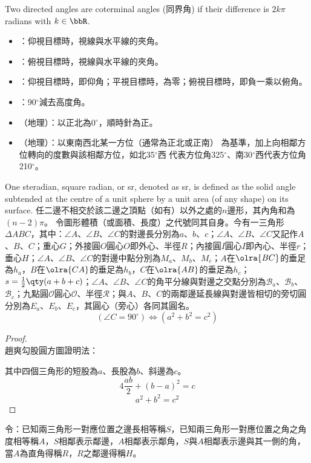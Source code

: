 \documentclass[a4paper,12pt]{report}
\begin{document}
Two directed angles are coterminal angles (同界角) if their difference is $2k\pi$ radians with $k\in\bbR$.
\begin{itemize}
\item {}：仰視目標時，視線與水平線的夾角。
\item {}：俯視目標時，視線與水平線的夾角。
\item {}：仰視目標時，即仰角；平視目標時，為零；俯視目標時，即負一乘以俯角。
\item {}：90$^{\circ}$減去高度角。
\item {}（地理）：以正北為0$^\circ$，順時針為正。
\item {}（地理）：以東南西北某一方位（通常為正北或正南） 為基準，加上向相鄰方位轉向的度數與該相鄰方位，如北35$^\circ$西 代表方位角325$^\circ$、南30$^\circ$西代表方位角210$^\circ$。
\end{itemize}
One steradian, square radian, or sr, denoted as sr, is defined as the solid angle subtended at the centre of a unit sphere by a unit area (of any shape) on its surface.
任二邊不相交於該二邊之頂點（如有）以外之處的$n$邊形，其內角和為$(n-2)\pi$。
令圖形體積（或面積、長度）之代號同其自身。今有一三角形$\Delta ABC$，其中：$\angle A$、$\angle B$、$\angle C$的對邊長分別為$a$、$b$、$c$；$\angle A$、$\angle B$、$\angle C$又記作$A$、$B$、$C$；重心$G$；外接圓$O$圓心$O$即外心、半徑$R$；內接圓$I$圓心$I$即內心、半徑$r$；垂心$H$；$\angle A$、$\angle B$、$\angle C$的對邊中點分別為$M_a$、$M_b$、$M_c$；$A$在$\olra{BC}$的垂足為$h_a$，$B$在$\olra{CA}$的垂足為$h_b$，$C$在$\olra{AB}$的垂足為$h_c$；$s=\frac{1}{2}\qty(a+b+c)$；$\angle A$、$\angle B$、$\angle C$的角平分線與對邊之交點分別為$\mathscr{B}_a$、$\mathscr{B}_b$、$\mathscr{B}_c$；九點圓$\mathscr{O}$圓心$\mathscr{O}$、半徑$\mathscr{R}$；與$A$、$B$、$C$的兩鄰邊延長線與對邊皆相切的旁切圓分別為$E_a$、$E_b$、$E_c$，其圓心（旁心）各同其圓名。
\[(\angle C=90^\circ)\iff (a^2+b^2=c^2)\]
\begin{proof}\mbox{}\\
趙爽勾股圓方圖證明法：
\begin{center}
\end{center}
其中四個三角形的短股為$a$、長股為$b$、斜邊為$c$。
\[4\frac{ab}{2}+(b-a)^2=c\]
\[a^2+b^2=c^2\]
\end{proof}
令：已知兩三角形一對應位置之邊長相等稱$S$，已知兩三角形一對應位置之角之角度相等稱$A$，$S$相鄰表示鄰邊，$A$相鄰表示鄰角，$S$與$A$相鄰表示邊與其一側的角，當$A$為直角得稱$R$，$R$之鄰邊得稱$H$。
\end{document}
